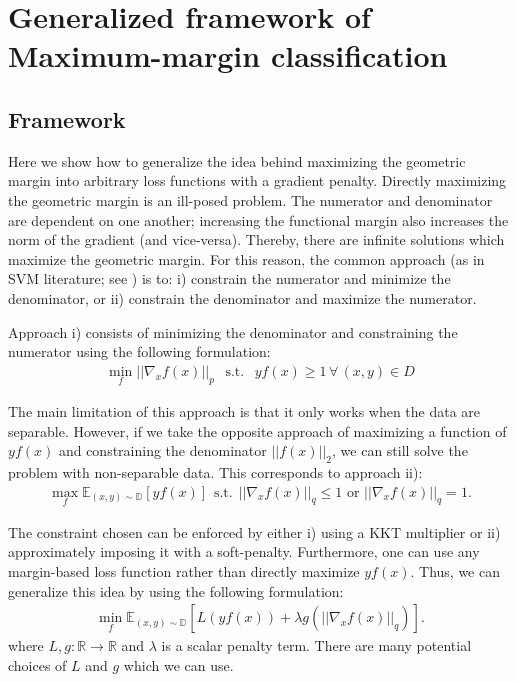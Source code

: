 \documentclass{article}
\begin{document}
\section{Generalized framework of Maximum-margin classification}
\label{sec:4}

\subsection{Framework}

Here we show how to generalize the idea behind maximizing the geometric margin into arbitrary loss functions with a gradient penalty. Directly maximizing the geometric margin is an ill-posed problem. The numerator and denominator are dependent on one another; increasing the functional margin also increases the norm of the gradient (and vice-versa). Thereby, there are infinite solutions which maximize the geometric margin. For this reason, the common approach (as in SVM literature; see \citet{cortes1995support}) is to: i) constrain the numerator and minimize the denominator, or ii) constrain the denominator and maximize the numerator.

Approach i) consists of minimizing the denominator and constraining the numerator using the following formulation:
\begin{align}\label{eqn:2} 
\min_{f} { ||\nabla_x f(x)||_p} \hspace{5pt} \text{ s.t. } \hspace{5pt} yf(x) \ge 1 \hspace{2pt}\forall\hspace{2pt} (x,y) \in D
\end{align}

The main limitation of this approach is that it only works when the data are separable. However, if we take the opposite approach of maximizing a function of $y f(x)$ and constraining the denominator $|| f(x) ||_2$, we can still solve the problem with non-separable data. This corresponds to approach ii):
\begin{align}
 \max_{f} \mathbb{E}_{(x,y)\sim \mathbb{D}} \left[y f(x)\right] \hspace{1pt} \text{ s.t. } \hspace{1pt} ||\nabla_x f(x)||_q \leq 1 \text{ or } ||\nabla_x f(x)||_q = 1.
\end{align}

The constraint chosen can be enforced by either i) using a KKT multiplier \citep{kuhn1951nonlinear, karush1939minima} or ii) approximately imposing it with a soft-penalty. Furthermore, one can use any margin-based loss function rather than directly maximize $yf(x)$. Thus, we can generalize this idea by using the following formulation:
\begin{align}\label{eqn:6}
\min_f \mathbb{E}_{(x,y)\sim \mathbb{D}}\left[L(yf(x)) + \lambda g(||\nabla_x f(x)||_q)\right].
\end{align}
where $L,g:\mathbb{R}\to \mathbb{R}$ and $\lambda$ is a scalar penalty term. There are many potential choices of $L$ and $g$ which we can use. 
\end{document}
